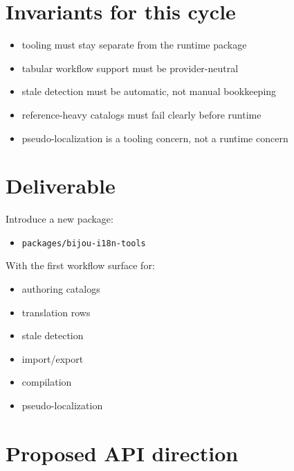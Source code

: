 \section{Invariants for this cycle}\label{record-189-invariants-for-this-cycle}

\begin{itemize}
\tightlist
\item
  tooling must stay separate from the runtime package
\item
  tabular workflow support must be provider-neutral
\item
  stale detection must be automatic, not manual bookkeeping
\item
  reference-heavy catalogs must fail clearly before runtime
\item
  pseudo-localization is a tooling concern, not a runtime concern
\end{itemize}

\section{Deliverable}\label{record-189-deliverable}

Introduce a new package:

\begin{itemize}
\tightlist
\item
  \texttt{p\allowbreak{}a\allowbreak{}c\allowbreak{}k\allowbreak{}a\allowbreak{}g\allowbreak{}e\allowbreak{}s\allowbreak{}/\allowbreak{}b\allowbreak{}i\allowbreak{}j\allowbreak{}o\allowbreak{}u\allowbreak{}-\allowbreak{}i\allowbreak{}1\allowbreak{}8\allowbreak{}n\allowbreak{}-\allowbreak{}t\allowbreak{}o\allowbreak{}o\allowbreak{}l\allowbreak{}s}
\end{itemize}

With the first workflow surface for:

\begin{itemize}
\tightlist
\item
  authoring catalogs
\item
  translation rows
\item
  stale detection
\item
  import/export
\item
  compilation
\item
  pseudo-localization
\end{itemize}

\section{Proposed API direction}\label{record-189-proposed-api-direction}

